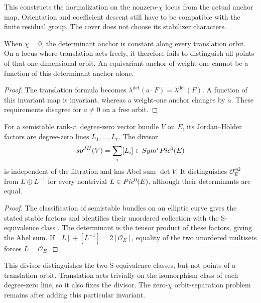 This constructs the normalization on the nonzero-$\chi$ locus from
the actual anchor map.  Orientation and coefficient descent still
have to be compatible with the finite residual group.  The cover
does not choose its stabilizer characters.

\begin{proposition}
\label{prop:determinant-anchor-chi-zero-degeneracy}
When $\chi=0$, the determinant anchor is constant along every
translation orbit.  On a locus where translation acts freely, it
therefore fails to distinguish all points of that one-dimensional
orbit.  An equivariant anchor of weight one cannot be a function
of this determinant anchor alone.
\end{proposition}

\begin{proof}
The translation formula becomes
$\lambda^{\det}(a\cdot F)=\lambda^{\det}(F)$.
A function of this invariant map is invariant, whereas a
weight-one anchor changes by $a$.  These requirements disagree for
$a\ne0$ on a free orbit.
\end{proof}

\begin{proposition}
\label{prop:determinant-anchor-extra-data-separates-rank-two}
For a semistable rank-$r$, degree-zero vector bundle $V$ on $E$, its
Jordan--H\"older factors are degree-zero lines $L_1,\ldots,L_r$.
The divisor
\[
sp^{JH}(V)=\sum_i[L_i]
\in Sym^rPic^0(E)
\]
is independent of the filtration and has Abel sum $\det V$.
It distinguishes $\mathcal O_E^{\oplus2}$ from $L\oplus L^{-1}$
for every nontrivial $L\in Pic^0(E)$, although their determinants
are equal.
\end{proposition}

\begin{proof}
The classification of semistable bundles on an elliptic curve gives
the stated stable factors and identifies their unordered collection
with the S-equivalence class
\cite{AtiyahVectorBundlesElliptic,TuSemistableElliptic}.
The determinant is the tensor product of these factors, giving the
Abel sum.  If $[L]+[L^{-1}]=2[\mathcal O_E]$, equality of the two
unordered multisets forces $L=\mathcal O_E$.
\end{proof}

This divisor distinguishes the two S-equivalence classes, but not
points of a translation orbit.  Translation acts trivially on the
isomorphism class of each degree-zero line, so it also fixes the
divisor.  The zero-$\chi$ orbit-separation problem remains after
adding this particular invariant.

